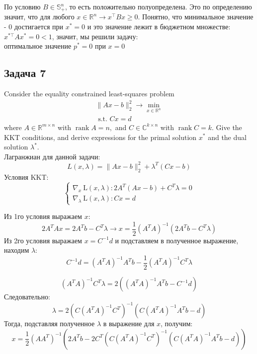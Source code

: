 \documentclass[a4paper,12pt]{article} %
\begin{document}
По условию $ B \in \mathbb{S}_{+}^{n}  $, то есть положительно полуопределена. Это по определению значит, что для любого $ x \in \mathbb{R}^{n} \rightarrow x^{\top}Bx \geq 0$. Понятно, что минимальное значение - 0 достигается при $ x^* = 0 $ и это значение лежит в бюджетном множестве: $ x^{*\top} A x^* = 0 < 1 $, значит, мы решили задачу:\\
оптимальное значение $ p^* = 0 $ при $ x = 0 $

\subsection*{Задача 7}
Consider the equality constrained least-squares problem
$$
\begin{array}{l}
\|A x-b\|_{2}^{2} \rightarrow \min\limits _{x \in \mathbb{R}^{n}} \\
\text { s.t. } C x=d
\end{array}
$$
where $A \in \mathbb{R}^{m \times n}$ with $\operatorname{rank} A=n,$ and $C \in \mathbb{C}^{k \times n}$ with $\operatorname{rank} C=k$. Give the KKT conditions, and derive expressions for the primal solution $x^{*}$ and the dual solution $\lambda^{*}$.\\

Лагранжиан для данной задачи:
$$
L(x, \lambda)=\|A x-b\|_{2}^{2}+\lambda^{T}(C x-b)
$$
Условия KKT:
$$
\left\{\begin{array}{l}
\nabla_{x} \mathrm{~L}(x, \lambda): 2 A^{T}(A x-b)+C^{T} \lambda=0 \\
\nabla_{\lambda} \mathrm{~L}(x, \lambda): C x=d
\end{array}\right.
$$

Из 1го условия выражаем $ x $:
$$
2 A^{T}A x = 2 A^{T}b-C^{T} \lambda \rightarrow x = \frac{1}{2}\left(A^{T} A\right)^{-1}\left(2 A^{T} b-C^{T} \lambda\right)
$$
Из 2го условия выражаем $ x = C^{-1} d $ и подставляем в полученное выражение, находим $ \lambda $:
$$
C^{-1} d = \left(A^{T} A\right)^{-1} A^{T} b - \frac{1}{2 } \left(A^{T} A\right)^{-1} C^T \lambda
$$

$$
\left(A^{T} A\right)^{-1} C^T \lambda = 2 \left( \left(A^{T} A\right)^{-1} A^{T} b - C^{-1} d  \right)
$$
Следовательно: 
$$
\lambda=2\left(C\left(A^{T} A\right)^{-1} C^{T}\right)^{-1}\left(C\left(A^{T} A\right)^{-1} A^{T} b-d\right)
$$
Тогда, подставляя полученное $ \lambda $ в выражение для $ x $, получим: 
$$
x=\frac{1}{2}\left(A A^{T}\right)^{-1}\left(2 A^{T} b-2C^{T} \left(C\left(A^{T} A\right)^{-1} C^{T}\right)^{-1}\left(C\left(A^{T} A\right)^{-1} A^{T} b-d\right)\right)
$$
\end{document}
